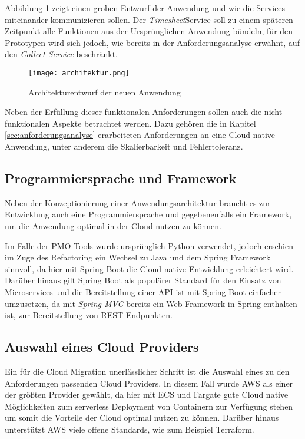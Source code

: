 Abbildung \ref{fig:Architektur} zeigt einen groben  Entwurf der Anwendung und wie die Services miteinander kommunizieren sollen. Der \textit{\gls{Timesheet}}Service soll zu einem späteren Zeitpunkt alle Funktionen aus der Ursprünglichen Anwendung bündeln, für den Prototypen wird sich jedoch, wie bereits in der Anforderungsanalyse erwähnt, auf den \textit{Collect Service} beschränkt.

\begin{figure}[H]
    \centering
    \texttt{[image: architektur.png]}
    \caption{Architekturentwurf der neuen Anwendung}
    \label{fig:Architektur}
\end{figure}

Neben der Erfüllung dieser funktionalen Anforderungen sollen auch die nicht-funktionalen Aspekte betrachtet werden. Dazu gehören die in Kapitel \ref{sec:anforderungsanalyse} erarbeiteten Anforderungen an eine Cloud-native Anwendung, unter anderem die Skalierbarkeit und Fehlertoleranz. \pagebreak

\subsection{Programmiersprache und Framework}
Neben der Konzeptionierung einer Anwendungsarchitektur braucht es zur Entwicklung auch eine Programmiersprache und gegebenenfalls ein Framework, um die Anwendung optimal in der Cloud nutzen zu können. 

Im Falle der PMO-Tools wurde ursprünglich Python verwendet, jedoch erschien im Zuge des Refactoring ein Wechsel zu Java und dem \gls{Spring} Framework sinnvoll, da hier mit \gls{Spring Boot} die Cloud-native Entwicklung erleichtert wird. Darüber hinaus gilt \gls{Spring Boot} als populärer Standard für den Einsatz von Microservices und die Bereitstellung einer \ac{API} ist mit \gls{Spring Boot} einfacher umzusetzen, da mit \textit{Spring MVC} bereits ein Web-Framework in \gls{Spring} enthalten ist, zur Bereitstellung von \ac{REST}-Endpunkten.

\subsection{Auswahl eines Cloud Providers}
Ein für die Cloud Migration unerlässlicher Schritt ist die Auswahl eines zu den Anforderungen passenden Cloud Providers. In diesem Fall wurde \ac{AWS} als einer der größten Provider \cite[Vgl.][S. 6]{Sustar2022} gewählt, da hier mit \ac{ECS} und \gls{Fargate} gute Cloud native Möglichkeiten zum serverless Deployment von Containern zur Verfügung stehen um somit die Vorteile der Cloud optimal nutzen zu können. Darüber hinaus unterstützt \ac{AWS} viele offene Standards, wie zum Beispiel Terraform.

